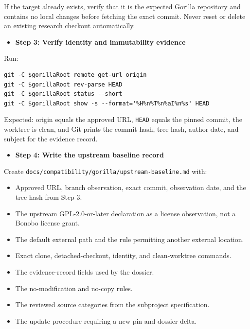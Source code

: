 \documentclass[
  letterpaper,
]{article}
\newcommand{\passthrough}[1]{#1}
\providecommand{\tightlist}{%
  \setlength{\itemsep}{0pt}\setlength{\parskip}{0pt}}
\begin{document}
If the target already exists, verify that it is the expected Gorilla repository and contains no local changes before
fetching the exact commit. Never reset or delete an existing research checkout automatically.

\begin{itemize}
\tightlist
\item[$\boxtimes$]
  \textbf{Step 3: Verify identity and immutability evidence}
\end{itemize}

Run:

\begin{lstlisting}
git -C $gorillaRoot remote get-url origin
git -C $gorillaRoot rev-parse HEAD
git -C $gorillaRoot status --short
git -C $gorillaRoot show -s --format='%H%n%T%n%aI%n%s' HEAD
\end{lstlisting}

Expected: origin equals the approved URL, \passthrough{\lstinline!HEAD!} equals the pinned commit, the worktree is
clean, and Git prints the commit hash, tree hash, author date, and subject for the evidence record.

\begin{itemize}
\tightlist
\item[$\boxtimes$]
  \textbf{Step 4: Write the upstream baseline record}
\end{itemize}

Create \nolinkurl{docs/compatibility/gorilla/upstream-baseline.md} with:

\begin{itemize}
\tightlist
\item
  Approved URL, branch observation, exact commit, observation date, and the tree hash from Step 3.
\item
  The upstream GPL-2.0-or-later declaration as a license observation, not a Bonobo license grant.
\item
  The default external path and the rule permitting another external location.
\item
  Exact clone, detached-checkout, identity, and clean-worktree commands.
\item
  The evidence-record fields used by the dossier.
\item
  The no-modification and no-copy rules.
\item
  The reviewed source categories from the subproject specification.
\item
  The update procedure requiring a new pin and dossier delta.
\end{itemize}
\end{document}
